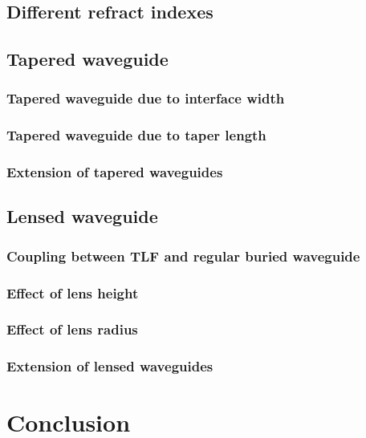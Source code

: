 \section{Different refract indexes}


\section{Tapered waveguide}


\subsection{Tapered waveguide due to interface width} 


\subsection{Tapered waveguide due to taper length}


\subsection{Extension of tapered waveguides}
\label{sect:optim_tapered_ext}


\section{Lensed waveguide}


\subsection{Coupling between TLF and regular buried waveguide}
\label{sect:optim_lensed_regular}


\subsection{Effect of lens height}

%
\subsection{Effect of lens radius}


\subsection{Extension of lensed waveguides}
\label{sect:optim_lensed_ext}

%
\chapter{Conclusion}










%



